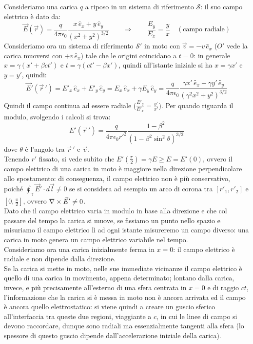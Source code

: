 Consideriamo una carica $ q $ a riposo in un sistema di riferimento $	\mathcal{S} $: il suo campo elettrico è dato da:
\begin{equation}
	\vec{E}(\vec{r}) = \frac{q}{4\pi\epsilon_0} \frac{x\,\hat{e}_x + y\,\hat{e}_y}{(x^2+y^2)^{3/2}} \qquad\Longrightarrow\qquad \frac{E_y}{E_x} = \frac{y}{x} \quad (\text{campo radiale})
	\label{eq:30}
\end{equation} 
Consideriamo ora un sistema di riferimento $ \mathcal{S}' $ in moto con $ \vec{v} = -v\,\hat{e}_x $ ($ O' $ vede la carica muoversi con $ +v\,\hat{e}_x $) tale che le origini coincidano a $ t = 0 $: in generale $ x = \gamma (x' + \beta ct') $ e $ t = \gamma (ct' - \beta x') $, quindi all'istante iniziale si ha $ x = \gamma x' $ e $ y = y' $, quindi:
\begin{equation}
	\vec{E}'(\vec{r}\,') = E'_x\,\hat{e}_x + E'_y\,\hat{e}_y = E_x\,\hat{e}_x + \gamma E_y\,\hat{e}_y = \frac{q}{4\pi\epsilon_0} \frac{\gamma x' \,\hat{e}_x + \gamma y' \,\hat{e}_y}{(\gamma^2x^2+y^2)^{3/2}}
	\label{eq:31}
\end{equation}
Quindi il campo continua ad essere radiale ($ \frac{E'_y}{E'_x} = \frac{y'}{x'} $). Per quando riguarda il modulo, svolgendo i calcoli si trova:
\begin{equation}
	E'(\vec{r}\,') = \frac{q}{4\pi\epsilon_0 r'^2} \frac{1-\beta^2}{(1 - \beta^2\sin^2\theta)^{3/2}}
	\label{eq:32}
\end{equation}
dove $ \theta $ è l'angolo tra $ \vec{r}\,' $ e $ \vec{v} $. \\ 
%
Tenendo $ r' $ fissato, si vede subito che $ E'(\frac{\pi}{2}) = \gamma E \ge E = E'(0) $, ovvero il campo elettrico di una carica in moto è maggiore nella direzione perpendicolare allo spostamento: di conseguenza, il campo elettrico non è più conservativo, poiché $ \oint_{\gamma}\vec{E}'\cdot d\vec{l} \neq 0 $ se si considera ad esempio un arco di corona tra $ [r'_1,r'_2] $ e $ [0,\frac{\pi}{2}] $, ovvero $ \nabla\times\vec{E}' \neq 0 $. \\ 
%
Dato che il campo elettrico varia in modulo in base alla direzione e che col passare del tempo la carica si muove, se fissiamo un punto nello spazio e misuriamo il campo elettrico lì ad ogni istante misureremo un campo diverso: una carica in moto genera un campo elettrico variabile nel tempo. \\ 
%
Consideriamo ora una carica inizialmente ferma in $ x = 0 $: il campo elettrico è radiale e non dipende dalla direzione. \\Se la carica si mette in moto, nelle sue immediate vicinanze il campo elettrico è quello di una carica in movimento, appena determinato; lontano dalla carica, invece, e più precisamente all'esterno di una sfera centrata in $ x = 0 $ e di raggio $ ct $, l'informazione che la carica si è messa in moto non è ancora arrivata ed il campo è ancora quello elettrostatico: si viene quindi a creare un guscio sferico all'interfaccia tra queste due regioni, viaggiante a $ c $, in cui le linee di campo si devono raccordare, dunque sono radiali ma essenzialmente tangenti alla sfera (lo spessore di questo guscio dipende dall'accelerazione iniziale della carica). \\ 
